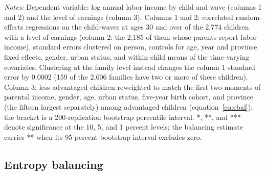 \documentclass[11pt]{article}
\begin{document}
\begin{table}[t]
\centering
\small
\caption{The premium net of parental income: three estimates.}
\label{tab:cre}

\par\smallskip
\begin{minipage}{0.92\textwidth}
\footnotesize\emph{Notes:} Dependent variable: log annual labor income
by child and wave (columns 1 and 2) and the level of earnings (column
3). Columns 1 and 2: correlated random-effects regressions on the child-waves at ages 30 and over of the 2,774 children with a level of earnings (column 2: the 2,185 of them whose parents report labor income), standard errors clustered on person, controls for
age, year and province fixed effects, gender, urban status, and
within-child means of the time-varying covariates. Clustering at the family level instead changes the column 1 standard error by 0.0002 (159 of the 2,606 families have two or more of these children). Column 3: less advantaged children reweighted to match the first two
moments of parental income, gender, age, urban status, five-year birth cohort, and province (the fifteen largest separately) among advantaged children (equation~\eqref{eq:ebal}); the
bracket is a 200-replication bootstrap percentile interval.
*, **, and *** denote significance at the 10, 5, and 1 percent levels; the balancing estimate carries ** when its 95 percent bootstrap interval excludes zero.
\end{minipage}
\end{table}

\subsection{Entropy balancing}
\label{sec:ebal}
\end{document}
